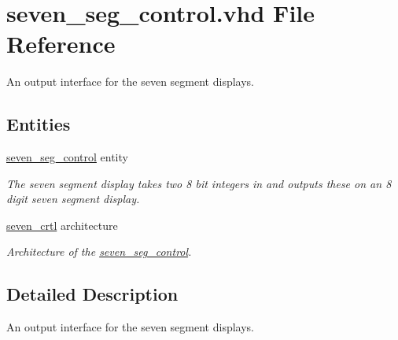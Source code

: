\hypertarget{seven__seg__control_8vhd}{\section{seven\-\_\-seg\-\_\-control.\-vhd File Reference}
\label{seven__seg__control_8vhd}
}


An output interface for the seven segment displays.  


\subsection*{Entities}
\begin{DoxyCompactItemize}
\item 
\hyperlink{classseven__seg__control}{seven\-\_\-seg\-\_\-control} entity
\begin{DoxyCompactList}\small\item\em The seven segment display takes two 8 bit integers in and outputs these on an 8 digit seven segment display. \end{DoxyCompactList}\item 
\hyperlink{classseven__seg__control_1_1seven__crtl}{seven\-\_\-crtl} architecture
\begin{DoxyCompactList}\small\item\em Architecture of the \hyperlink{classseven__seg__control}{seven\-\_\-seg\-\_\-control}. \end{DoxyCompactList}\end{DoxyCompactItemize}


\subsection{Detailed Description}
An output interface for the seven segment displays. 